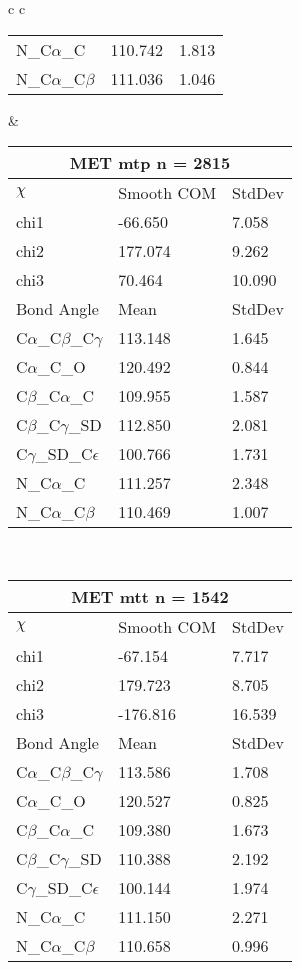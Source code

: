\begin{longtable}{ c c }
\begin{tabular}{ l l l }
  N\_C$\alpha$\_C & 110.742 & 1.813\\
  N\_C$\alpha$\_C$\beta$ & 111.036 & 1.046\\
  \bottomrule
  \end{tabular}
  &
  \begin{tabular}{ l l l }
  \toprule
  \multicolumn{3}{c}{MET \textbf{mtp} n = 2815} \\ \toprule
  $\chi$       & Smooth COM & StdDev \\ \midrule
  chi1 & -66.650 & 7.058 \\ 
  chi2 & 177.074 & 9.262 \\ 
  chi3 & 70.464 & 10.090 \\ \midrule
  Bond Angle   & Mean     & StdDev \\ \midrule
  C$\alpha$\_C$\beta$\_C$\gamma$ & 113.148 & 1.645\\
  C$\alpha$\_C\_O & 120.492 & 0.844\\
  C$\beta$\_C$\alpha$\_C & 109.955 & 1.587\\
  C$\beta$\_C$\gamma$\_SD & 112.850 & 2.081\\
  C$\gamma$\_SD\_C$\epsilon$ & 100.766 & 1.731\\
  N\_C$\alpha$\_C & 111.257 & 2.348\\
  N\_C$\alpha$\_C$\beta$ & 110.469 & 1.007\\
  \bottomrule
  \end{tabular}
  \\
  \begin{tabular}{ l l l }
  \toprule
  \multicolumn{3}{c}{MET \textbf{mtt} n = 1542} \\ \toprule
  $\chi$       & Smooth COM & StdDev \\ \midrule
  chi1 & -67.154 & 7.717 \\ 
  chi2 & 179.723 & 8.705 \\ 
  chi3 & -176.816 & 16.539 \\ \midrule
  Bond Angle   & Mean     & StdDev \\ \midrule
  C$\alpha$\_C$\beta$\_C$\gamma$ & 113.586 & 1.708\\
  C$\alpha$\_C\_O & 120.527 & 0.825\\
  C$\beta$\_C$\alpha$\_C & 109.380 & 1.673\\
  C$\beta$\_C$\gamma$\_SD & 110.388 & 2.192\\
  C$\gamma$\_SD\_C$\epsilon$ & 100.144 & 1.974\\
  N\_C$\alpha$\_C & 111.150 & 2.271\\
  N\_C$\alpha$\_C$\beta$ & 110.658 & 0.996\\

\end{tabular}
\end{longtable}
